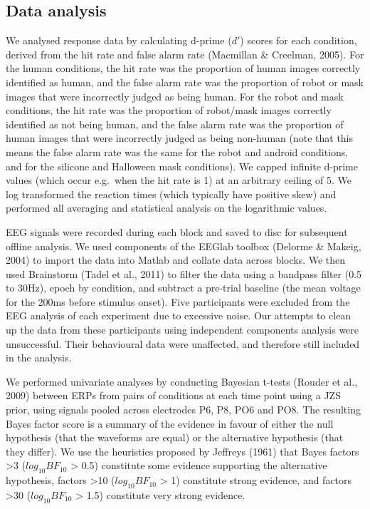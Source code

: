 \documentclass[
]{article}
\begin{document}
\subsection{Data analysis}\label{data-analysis}

We analysed response data by calculating d-prime (\(d'\)) scores for each condition, derived from the hit rate and false alarm rate (Macmillan \& Creelman, 2005). For the human conditions, the hit rate was the proportion of human images correctly identified as human, and the false alarm rate was the proportion of robot or mask images that were incorrectly judged as being human. For the robot and mask conditions, the hit rate was the proportion of robot/mask images correctly identified as not being human, and the false alarm rate was the proportion of human images that were incorrectly judged as being non-human (note that this means the false alarm rate was the same for the robot and android conditions, and for the silicone and Halloween mask conditions). We capped infinite d-prime values (which occur e.g.~when the hit rate is 1) at an arbitrary ceiling of 5. We log transformed the reaction times (which typically have positive skew) and performed all averaging and statistical analysis on the logarithmic values.

EEG signals were recorded during each block and saved to disc for subsequent offline analysis. We used components of the EEGlab toolbox (Delorme \& Makeig, 2004) to import the data into Matlab and collate data across blocks. We then used Brainstorm (Tadel et al., 2011) to filter the data using a bandpass filter (0.5 to 30Hz), epoch by condition, and subtract a pre-trial baseline (the mean voltage for the 200ms before stimulus onset). Five participants were excluded from the EEG analysis of each experiment due to excessive noise. Our attempts to clean up the data from these participants using independent components analysis were unsuccessful. Their behavioural data were unaffected, and therefore still included in the analysis.

We performed univariate analyses by conducting Bayesian t-tests (Rouder et al., 2009) between ERPs from pairs of conditions at each time point using a JZS prior, using signals pooled across electrodes P6, P8, PO6 and PO8. The resulting Bayes factor score is a summary of the evidence in favour of either the null hypothesis (that the waveforms are equal) or the alternative hypothesis (that they differ). We use the heuristics proposed by Jeffreys (1961) that Bayes factors \textgreater3 (\(log_{10}BF_{10}\) \textgreater{} 0.5) constitute some evidence supporting the alternative hypothesis, factors \textgreater10 (\(log_{10}BF_{10}\) \textgreater{} 1) constitute strong evidence, and factors \textgreater30 (\(log_{10}BF_{10}\) \textgreater{} 1.5) constitute very strong evidence.
\end{document}
